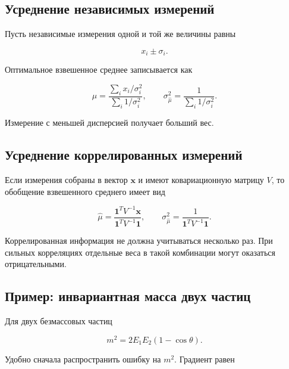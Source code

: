 \documentclass[
  russian,
  12pt,
  a4paper,
  a4paper,
  openany]{scrbook}
\begin{document}
\subsection{Усреднение независимых
измерений}\label{ux443ux441ux440ux435ux434ux43dux435ux43dux438ux435-ux43dux435ux437ux430ux432ux438ux441ux438ux43cux44bux445-ux438ux437ux43cux435ux440ux435ux43dux438ux439}

Пусть независимые измерения одной и той же величины равны

\[
x_i\pm\sigma_i.
\]

Оптимальное взвешенное среднее записывается как

\[
\boxed{
\widehat\mu
=
\frac{\sum_i x_i/\sigma_i^2}{\sum_i1/\sigma_i^2},
\qquad
\sigma_{\widehat\mu}^2
=
\frac{1}{\sum_i1/\sigma_i^2}.
}
\]

Измерение с меньшей дисперсией получает больший вес.

\subsection{Усреднение коррелированных
измерений}\label{ux443ux441ux440ux435ux434ux43dux435ux43dux438ux435-ux43aux43eux440ux440ux435ux43bux438ux440ux43eux432ux430ux43dux43dux44bux445-ux438ux437ux43cux435ux440ux435ux43dux438ux439}

Если измерения собраны в вектор \(\mathbf x\) и имеют ковариационную
матрицу \(V\), то обобщение взвешенного среднего имеет вид

\[
\boxed{
\widehat\mu
=
\frac{\mathbf1^TV^{-1}\mathbf x}{\mathbf1^TV^{-1}\mathbf1},
\qquad
\sigma_{\widehat\mu}^2
=
\frac{1}{\mathbf1^TV^{-1}\mathbf1}.
}
\]

Коррелированная информация не должна учитываться несколько раз. При
сильных корреляциях отдельные веса в такой комбинации могут оказаться
отрицательными.

\subsection{Пример: инвариантная масса двух
частиц}\label{ux43fux440ux438ux43cux435ux440-ux438ux43dux432ux430ux440ux438ux430ux43dux442ux43dux430ux44f-ux43cux430ux441ux441ux430-ux434ux432ux443ux445-ux447ux430ux441ux442ux438ux446}

Для двух безмассовых частиц

\[
m^2=2E_1E_2(1-\cos\theta).
\]

Удобно сначала распространить ошибку на \(m^2\). Градиент равен
\end{document}

